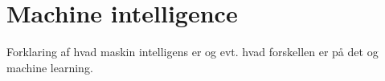 \section{Machine intelligence}

Forklaring af hvad maskin intelligens er og evt. hvad forskellen er på det og machine learning.